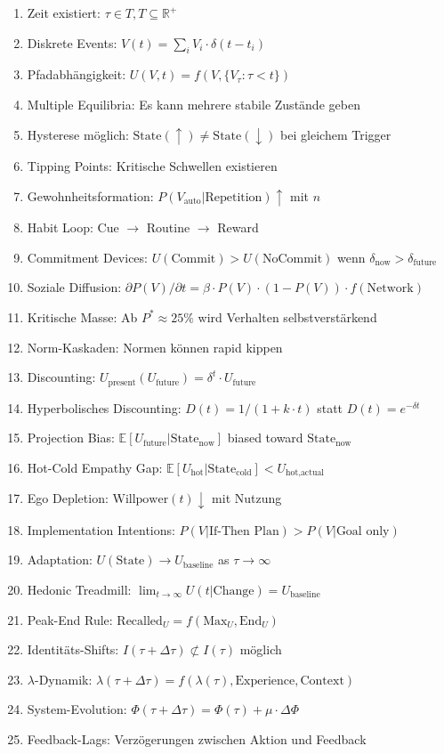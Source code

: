 \begin{enumerate}[label=MA-DYN-\arabic*:, leftmargin=3cm]
    \item Zeit existiert: $\tau \in T, T \subseteq \mathbb{R}^+$
    \item Diskrete Events: $V(t) = \sum_i V_i \cdot \delta(t - t_i)$
    \item Pfadabhängigkeit: $U(V, t) = f(V, \{V_\tau : \tau < t\})$
    \item Multiple Equilibria: Es kann mehrere stabile Zustände geben
    \item Hysterese möglich: $\text{State}(\uparrow) \neq \text{State}(\downarrow)$ bei gleichem Trigger
    \item Tipping Points: Kritische Schwellen existieren
    \item Gewohnheitsformation: $P(V_{\text{auto}}|\text{Repetition}) \uparrow$ mit $n$
    \item Habit Loop: Cue $\rightarrow$ Routine $\rightarrow$ Reward
    \item Commitment Devices: $U(\text{Commit}) > U(\text{NoCommit})$ wenn $\delta_{\text{now}} > \delta_{\text{future}}$
    \item Soziale Diffusion: $\partial P(V)/\partial t = \beta \cdot P(V) \cdot (1 - P(V)) \cdot f(\text{Network})$
    \item Kritische Masse: Ab $P^* \approx 25\%$ wird Verhalten selbstverstärkend
    \item Norm-Kaskaden: Normen können rapid kippen
    \item Discounting: $U_{\text{present}}(U_{\text{future}}) = \delta^t \cdot U_{\text{future}}$
    \item Hyperbolisches Discounting: $D(t) = 1/(1 + k \cdot t)$ statt $D(t) = e^{-\delta t}$
    \item Projection Bias: $\mathbb{E}[U_{\text{future}}|\text{State}_{\text{now}}]$ biased toward $\text{State}_{\text{now}}$
    \item Hot-Cold Empathy Gap: $\mathbb{E}[U_{\text{hot}}|\text{State}_{\text{cold}}] < U_{\text{hot,actual}}$
    \item Ego Depletion: $\text{Willpower}(t) \downarrow$ mit Nutzung
    \item Implementation Intentions: $P(V|\text{If-Then Plan}) > P(V|\text{Goal only})$
    \item Adaptation: $U(\text{State}) \rightarrow U_{\text{baseline}}$ as $\tau \rightarrow \infty$
    \item Hedonic Treadmill: $\lim_{t \rightarrow \infty} U(t|\text{Change}) = U_{\text{baseline}}$
    \item Peak-End Rule: $\text{Recalled}_U = f(\text{Max}_U, \text{End}_U)$
    \item Identitäts-Shifts: $I(\tau + \Delta\tau) \not\subset I(\tau)$ möglich
    \item $\lambda$-Dynamik: $\lambda(\tau + \Delta\tau) = f(\lambda(\tau), \text{Experience}, \text{Context})$
    \item System-Evolution: $\Phi(\tau + \Delta\tau) = \Phi(\tau) + \mu \cdot \Delta\Phi$
    \item Feedback-Lags: Verzögerungen zwischen Aktion und Feedback
\end{enumerate}



